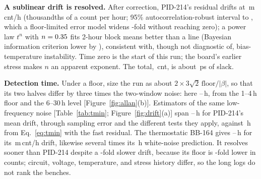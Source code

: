 \documentclass[10pt,twocolumn]{article}
\newcommand{\mcnth}{\,m\,cnt/h}
\begin{document}
\textbf{A sublinear drift is resolved.} After correction, PID-214's residual drifts at \vBetaRCA\mcnth{} (thousandths of a count per hour; 95\% autocorrelation-robust interval \vBetaLoRCA{} to \vBetaHiRCA, which a floor-limited error model widens \vCIwiden-fold without reaching zero); a power law $t^{n}$ with $n=0.35$ fits 2-hour block means better than a line (Bayesian information criterion lower by \vdBICblockRCA), consistent with, though not diagnostic of, bias-temperature instability. Time zero is the start of this run; the board's earlier stress makes $n$ an apparent exponent. The total, \vRCAdriftCnt\,cnt, is about \vRCAdriftPs\,ps of slack.

\textbf{Detection time.} Under a floor, size the run as about $2\times3\sqrt2\,\mathrm{floor}/|\beta|$, so that its two halves differ by three times the two-window noise: here \vAllanRunFloor--\vAllanRunPlateau\,h, from the 1--4\,h floor and the 6--30\,h level [Figure~\ref{fig:allan}(b)]. Estimators of the same low-frequency noise [Table~\ref{tab:tmin}; Figure~\ref{fig:drift}(a)] span \vDetLo--\vDetHi\,h for PID-214's mean drift, through sampling error and the different tests they apply, against \vTminBound\,h from Eq.~\eqref{eq:tmin} with the fast residual. The thermostatic BB-164 gives \vBBdetLo--\vBBdetHi\,h for its \vBetaBBlong\mcnth{} drift, likewise several times its \vBBdetWhite\,h white-noise prediction. It resolves sooner than PID-214 despite a \vDriftRatioLong-fold slower drift, because its floor is \vFloorCntRatioLong-fold lower in counts; circuit, voltage, temperature, and stress history differ, so the long logs do not rank the benches.
\end{document}
